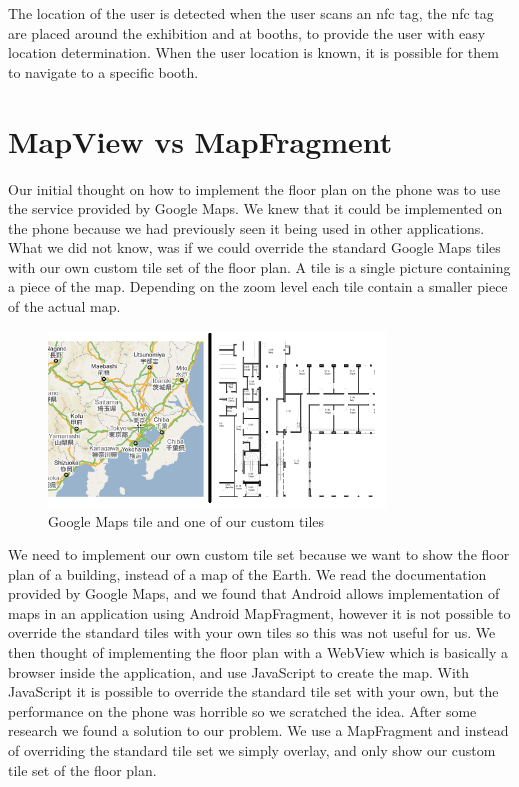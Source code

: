 The location of the user is detected when the user scans an \ac{nfc} tag, the \ac{nfc} tag are placed around the exhibition and at booths, to provide the user with easy location determination. When the user location is known, it is possible for them to navigate to a specific booth.

\section{MapView vs MapFragment}
Our initial thought on how to implement the floor plan on the phone was to use the service provided by Google Maps. We knew that it could be implemented on the phone because we had previously seen it being used in other applications. What we did not know, was if we could override the standard Google Maps tiles with our own custom tile set of the floor plan. A tile is a single picture containing a piece of the map. Depending on the zoom level each tile contain a smaller piece of the actual map.
\begin{figure}[H]
\centering
\includegraphics[width=0.8\textwidth]{img/tilessidebyside.png}
\caption{Google Maps tile and one of our custom tiles \citep{googlemaptile}}
\label{fig:maptiles}
\end{figure}
We need to implement our own custom tile set because we want to show the floor plan of a building, instead of a map of the Earth. We read the documentation provided by Google Maps\citep{googlemapsapi}, and we found that Android allows implementation of maps in an application using Android MapFragment, however it is not possible to override the standard tiles with your own tiles so this was not useful for us\citep{googlemapfragment}. We then thought of implementing the floor plan with a WebView which is basically a browser inside the application, and use JavaScript to create the map. With JavaScript it is possible to override the standard tile set with your own, but the performance on the phone was horrible so we scratched the idea. After some research we found a solution to our problem. We use a MapFragment and instead of overriding the standard tile set we simply overlay, and only show our custom tile set of the floor plan.

